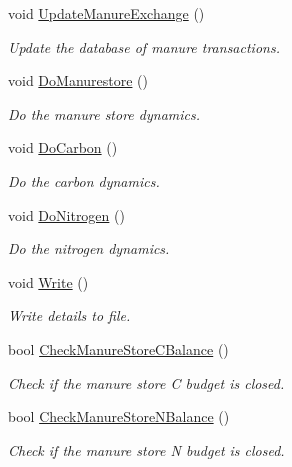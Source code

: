 \begin{DoxyCompactItemize}
\mbox{\label{classmanure_store_a2018264038e021dc1bd770557587f468}} 
void \mbox{\hyperlink{classmanure_store_a2018264038e021dc1bd770557587f468}{Update\+Manure\+Exchange}} ()
\begin{DoxyCompactList}\small\item\em Update the database of manure transactions. \end{DoxyCompactList}\item 
\mbox{\label{classmanure_store_a82539494f37b506deb4c398558b7d9a3}} 
void \mbox{\hyperlink{classmanure_store_a82539494f37b506deb4c398558b7d9a3}{Do\+Manurestore}} ()
\begin{DoxyCompactList}\small\item\em Do the manure store dynamics. \end{DoxyCompactList}\item 
\mbox{\label{classmanure_store_a4d1191eaab06551dece64f91c207e3f5}} 
void \mbox{\hyperlink{classmanure_store_a4d1191eaab06551dece64f91c207e3f5}{Do\+Carbon}} ()
\begin{DoxyCompactList}\small\item\em Do the carbon dynamics. \end{DoxyCompactList}\item 
\mbox{\label{classmanure_store_aada25a32d476b57dbeebd25786d5b0bf}} 
void \mbox{\hyperlink{classmanure_store_aada25a32d476b57dbeebd25786d5b0bf}{Do\+Nitrogen}} ()
\begin{DoxyCompactList}\small\item\em Do the nitrogen dynamics. \end{DoxyCompactList}\item 
\mbox{\label{classmanure_store_a78539590211c7a2a278df92b41bbd1d0}} 
void \mbox{\hyperlink{classmanure_store_a78539590211c7a2a278df92b41bbd1d0}{Write}} ()
\begin{DoxyCompactList}\small\item\em Write details to file. \end{DoxyCompactList}\item 
bool \mbox{\hyperlink{classmanure_store_a15e3ef4a2d1ffe2d556b213ff2b5c378}{Check\+Manure\+Store\+C\+Balance}} ()
\begin{DoxyCompactList}\small\item\em Check if the manure store C budget is closed. \end{DoxyCompactList}\item 
bool \mbox{\hyperlink{classmanure_store_a6aa8b1751c4d53ac68ec113efc055c1d}{Check\+Manure\+Store\+N\+Balance}} ()
\begin{DoxyCompactList}\small\item\em Check if the manure store N budget is closed. \end{DoxyCompactList}\end{DoxyCompactItemize}
